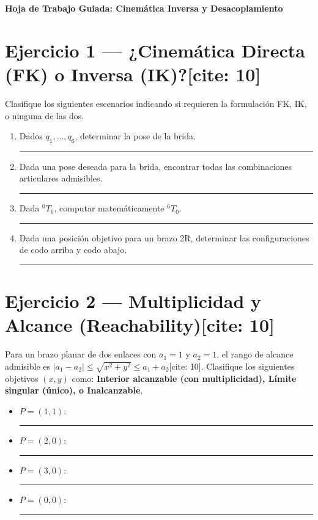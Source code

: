 \documentclass[11pt, a4paper]{article}
\begin{document}
\begin{center}
    \Large\textbf{\textcolor{ucbblue}{Hoja de Trabajo Guiada: Cinemática Inversa y Desacoplamiento}}\\[0.2cm]
\end{center}

\vspace{0.4cm}

\section*{Ejercicio 1 — ¿Cinemática Directa (FK) o Inversa (IK)?[cite: 10]}
Clasifique los siguientes escenarios indicando si requieren la formulación FK, IK, o ninguna de las dos.
\begin{enumerate}
    \item Dados $q_1, \ldots, q_6$, determinar la pose de la brida. \rule{4cm}{0.15mm}
    \item Dada una pose deseada para la brida, encontrar todas las combinaciones articulares admisibles. \rule{4cm}{0.15mm}
    \item Dada ${}^0T_6$, computar matemáticamente ${}^6T_0$. \rule{4cm}{0.15mm}
    \item Dada una posición objetivo para un brazo 2R, determinar las configuraciones de codo arriba y codo abajo. \rule{4cm}{0.15mm}
\end{enumerate}

\section*{Ejercicio 2 — Multiplicidad y Alcance (Reachability)[cite: 10]}
Para un brazo planar de dos enlaces con $a_1 = 1$ y $a_2 = 1$, el rango de alcance admisible es $|a_1-a_2| \le \sqrt{x^2+y^2} \le a_1+a_2$[cite: 10]. Clasifique los siguientes objetivos $(x,y)$ como: \textbf{Interior alcanzable (con multiplicidad), Límite singular (único), o Inalcanzable}.
\begin{itemize}
    \item $P = (1, 1)$: \rule{6cm}{0.15mm}
    \item $P = (2, 0)$: \rule{6cm}{0.15mm}
    \item $P = (3, 0)$: \rule{6cm}{0.15mm}
    \item $P = (0, 0)$: \rule{6cm}{0.15mm}
\end{itemize}
\end{document}
